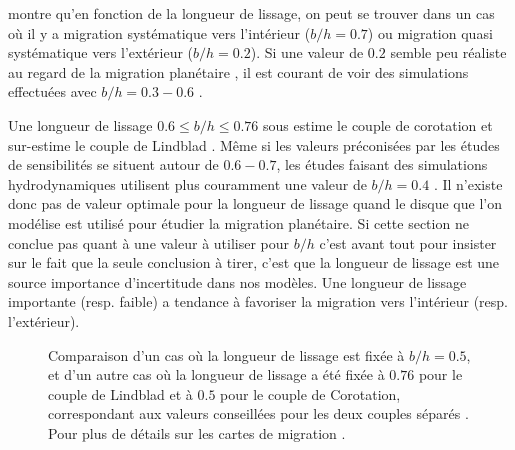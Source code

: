  montre qu'en fonction de la longueur de lissage, on peut se trouver dans un cas où il y a migration systématique vers l'intérieur ($b/h=0.7$) ou migration quasi systématique vers l'extérieur ($b/h=0.2$). Si une valeur de $0.2$ semble peu réaliste au regard de la migration planétaire \citep{muller2012treating}, il est courant de voir des simulations effectuées avec $b/h=0.3-0.6$ \citep{masset2002coorbital, devalborro2006comparative, paardekooper2009corotation}. 

Une longueur de lissage $0.6 \leqslant b/h \leqslant 0.76$ sous estime le couple de corotation et sur-estime le couple de Lindblad \citep{masset2002coorbital}. Même si les valeurs préconisées par les études de sensibilités se situent autour de $0.6-0.7$, les études faisant des simulations hydrodynamiques utilisent plus couramment une valeur de $b/h=0.4$ \citep{paardekooper2011torque}. Il n'existe donc pas de valeur optimale pour la longueur de lissage quand le disque que l'on modélise est utilisé pour étudier la migration planétaire. Si cette section ne conclue pas quant à une valeur à utiliser pour $b/h$ c'est avant tout pour insister sur le fait que la seule conclusion à tirer, c'est que la longueur de lissage est une source importance d'incertitude dans nos modèles. Une longueur de lissage importante (resp. faible) a tendance à favoriser la migration vers l'intérieur (resp. l'extérieur). 

\begin{figure}[htb]
\centering
{}\hfill
{}
\caption{Comparaison d'un cas où la longueur de lissage est fixée à $b/h=0.5$, et d'un autre cas où la longueur de lissage a été fixée à $0.76$ pour le couple de Lindblad et à $0.5$ pour le couple de Corotation, correspondant aux valeurs conseillées pour les deux couples séparés \citep{masset2002coorbital}. Pour plus de détails sur les cartes de migration .}\label{fig:modified_smoothing}
\end{figure}

